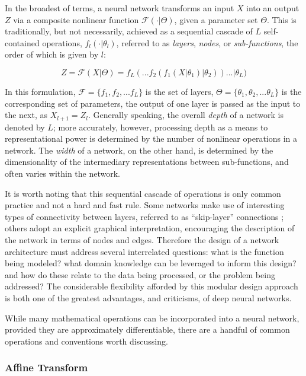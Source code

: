 In the broadest of terms, a neural network transforms an input $X$ into an output $Z$ via a composite nonlinear function $\mathcal{F}(\cdot \vert \Theta)$, given a parameter set $\Theta$.
This is traditionally, but not necessarily, achieved as a sequential cascade of $L$ self-contained operations, $f_l(\cdot \vert \theta_l)$, referred to as \emph{layers}, \emph{nodes}, or \emph{sub-functions}, the order of which is given by $l$:

\begin{equation}
\label{eq:layers}
Z = \mathcal{F}(X \vert \Theta) = f_{L}(  ... f_2(f_1(X \vert \theta_1) \vert \theta_2) ) ... \vert \theta_{L})
\end{equation}

\noindent In this formulation, $\mathcal{F} = \{f_1, f_2, ... f_{L} \}$ is the set of layers, $\Theta = \{\theta_1, \theta_2, ... \theta_{L} \}$ is the corresponding set of parameters, the output of one layer is passed as the input to the next, as $X_{l+1} = Z_{l}$.
Generally speaking, the overall \emph{depth} of a network is denoted by $L$;
more accurately, however, processing depth as a means to representational power is determined by the number of nonlinear operations in a network.
The \emph{width} of a network, on the other hand, is determined by the dimensionality of the intermediary representations between sub-functions, and often varies within the network.

It is worth noting that this sequential cascade of operations is only common practice and not a hard and fast rule.
Some networks make use of interesting types of connectivity between layers, referred to as ``skip-layer'' connections \cite{Sermanet2011Traffic};
others adopt an explicit graphical interpretation, encouraging the description of the network in terms of nodes and edges.
Therefore the design of a network architecture must address several interrelated questions:
what is the function being modeled?
what domain knowledge can be leveraged to inform this design?
and how do these relate to the data being processed, or the problem being addressed?
The considerable flexibility afforded by this modular design approach is both one of the greatest advantages, and criticisms, of deep neural networks.

While many mathematical operations can be incorporated into a neural network, provided they are approximately differentiable, there are a handful of common operations and conventions worth discussing.

\subsubsection{Affine Transform}

